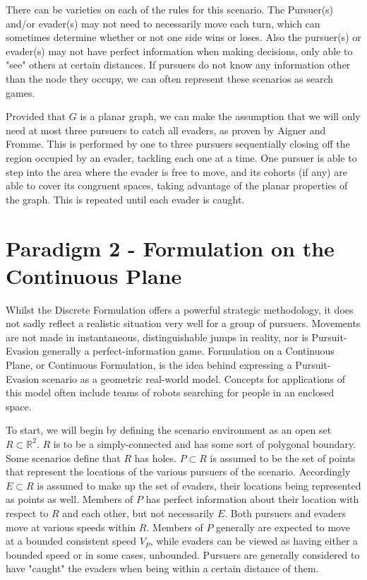 \documentclass{article}
\begin{document}
There can be varieties on each of the rules for this scenario. The Pursuer(s) and/or evader(s) may not need to necessarily move each turn, which can sometimes determine whether or not one side wins or loses. Also the pursuer(s) or evader(s) may not have perfect information when making decisions, only able to "see" others at certain distances. If pursuers do not know any information other than the node they occupy, we can often represent these scenarios as search games. \cite{parsons}

Provided that \(G\) is a planar graph, we can make the assumption that we will only need at most three pursuers to catch all evaders, as proven by Aigner and Fromme. This is performed by one to three pursuers sequentially closing off the region occupied by an evader, tackling each one at a time. One pursuer is able to step into the area where the evader is free to move, and its cohorts (if any) are able to cover its congruent spaces, taking advantage of the planar properties of the graph. This is repeated until each evader is caught. \cite{copsRobbers}

\section{Paradigm 2 - Formulation on the Continuous Plane}
Whilst the Discrete Formulation offers a powerful strategic methodology, it does not sadly reflect a realistic situation very well for a group of pursuers. Movements are not made in instantaneous, distinguishable jumps in reality, nor is Pursuit-Evasion generally a perfect-information game. Formulation on a Continuous Plane, or Continuous Formulation, is the idea behind expressing a Pursuit-Evasion scenario as a geometric real-world model. Concepts for applications of this model often include teams of robots searching for people in an enclosed space.

To start, we will begin by defining the scenario environment as an open set \(R\subset\mathbb{R}^2\). \(R\) is to be a simply-connected and has some sort of polygonal boundary. Some scenarios define that \(R\) has holes. \(P\subset R\) is assumed to be the set of points that represent the locations of the various pursuers of the scenario. Accordingly \(E\subset R\) is assumed to make up the set of evaders, their locations being represented as points as well. Members of \(P\) has perfect information about their location with respect to \(R\) and each other, but not necessarily \(E\). Both pursuers and evaders move at various speeds within \(R\). Members of \(P\) generally are expected to move at a bounded consistent speed \(V_P\), while evaders can be viewed as having either a bounded speed or in some cases, unbounded. \cite{limVis, robotics} Pursuers are generally considered to have "caught" the evaders when being within a certain distance of them.
\end{document}

